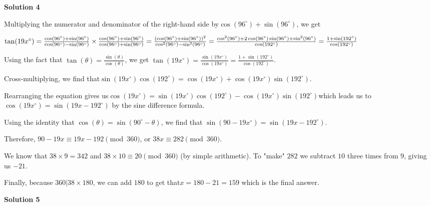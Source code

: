 \begin{enumerate}
\textbf{Solution 4}

Multiplying the numerator and denominator of the right-hand side by$\cos(96^{\circ})+\sin(96^{\circ})$, we get 

 ${\tan(19x^{\circ})}  ={\frac{\cos(96^{\circ}) +\sin(96^{\circ})}{\cos(96^{\circ})-\sin(96^{\circ})}}\times{\frac{\cos(96^{\circ})+\sin(96^{\circ})}{\cos(96^{\circ})+\sin(96^{\circ})}} \\  ={\frac{(\cos(96^{\circ})+\sin(96^{\circ}))^2}{\cos^2(96^{\circ})-\sin^2(96^{\circ})}} \\  ={\frac{\cos^2(96^{\circ}) + 2\cos(96^{\circ})\sin(96^{\circ}) + \sin^2(96^{\circ})}{\cos(192^{\circ})}} \\  ={\frac{1+\sin(192^{\circ})}{\cos(192^{\circ})}}$

 Using the fact that $\tan(\theta)=\frac{\sin(\theta)}{\cos(\theta)}$, we get $\tan(19x^{\circ})=\frac{\sin(19x^{\circ})}{\cos(19x^{\circ})}=\frac{1+\sin(192^{\circ})}{\cos(192^{\circ})}$.

 Cross-multiplying, we find that$\sin(19x^{\circ})\cos(192^{\circ})=\cos(19x^{\circ})+\cos(19x^{\circ})\sin(192^{\circ})$.

 Rearranging the equation gives us$\cos(19x^{\circ})=\sin(19x^{\circ})\cos(192^{\circ})-\cos(19x^{\circ})\sin(192^{\circ})$which leads us to $\cos(19x^{\circ})=\sin(19x-192^{\circ})$ by the sine difference formula.

 Using the identity that $\cos(\theta)=\sin(90^{\circ}-\theta)$, we find that $\sin(90-19x^{\circ})=\sin(19x-192^{\circ})$. 

 Therefore, $90-19x \equiv 19x-192 \pmod{360}$, or $38x \equiv 282 \pmod{360}$. 

 We know that $38 \times 9=342$ and $38 \times 10 \equiv 20 \pmod{360}$ (by simple arithmetic). To "make" $282$ we subtract $10$ three times from $9$, giving us $-21$. 

 Finally, because $360|38 \times 180$, we can add $180$ to get that$x=180-21=\boxed{159}$ which is the final answer.

 


 



\textbf{Solution 5}


\end{enumerate}
